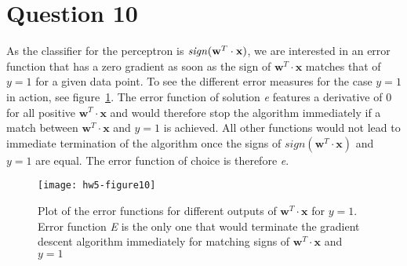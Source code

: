 \documentclass[	11pt,
				a4paper,
				twoside,
				titlepage,
				bibtotoc,
				openright,
				cleardoublepage=empty
				]{scrartcl}
\begin{document}
\section{Question 10} %
As the classifier for the perceptron is $\text{\emph{sign}}(\mathbf{w}^T \cdot \mathbf{x})$, we are interested in an error function that has a zero gradient as soon as the sign of $\mathbf{w}^T \cdot \mathbf{x}$ matches that of $y = 1$ for a given data point. To see the different error measures for the case $y = 1$ in action, see figure~\ref{fig:10}. The error function of solution \emph{e} features a derivative of $0$ for all positive  $\mathbf{w}^T \cdot \mathbf{x}$ and would therefore stop the algorithm immediately if a match between $\mathbf{w}^T \cdot \mathbf{x}$ and $y = 1$ is achieved. All other functions would not lead to immediate termination of the algorithm once the signs of $sign(\mathbf{w}^T \cdot \mathbf{x})$ and $y = 1$ are equal. The error function of choice is therefore \emph{e}.
\begin{figure}[!h]
	\texttt{[image: hw5-figure10]}
	\caption{Plot of the error functions for different outputs of $\mathbf{w}^T \cdot \mathbf{x}$ for $y = 1$. Error function \emph{E} is the only one that would terminate the gradient descent algorithm immediately for matching signs of $\mathbf{w}^T \cdot \mathbf{x}$ and $y = 1$}
	\label{fig:10}
\end{figure}
\end{document}
